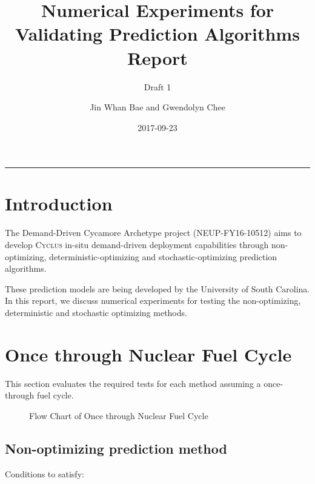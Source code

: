 \documentclass[12pt,letterpaper]{article}
\title{Numerical Experiments for Validating Prediction Algorithms Report}
\subtitle{Draft 1}
\author{Jin Whan Bae and Gwendolyn Chee}
\date{2017-09-23}
\newcommand{\Cyclus}{\textsc{Cyclus}\xspace}%
\begin{document}
	
	\maketitle
	\hrule
	\onehalfspacing
	\thispagestyle{empty}

\section*{Introduction}
The Demand-Driven Cycamore Archetype project (NEUP-FY16-10512) aims to develop \Cyclus in-situ demand-driven deployment capabilities through non-optimizing, deterministic-optimizing and stochastic-optimizing prediction algorithms.

These prediction models are being developed by the University of South Carolina. In this report, we discuss numerical experiments for testing the non-optimizing, deterministic and stochastic optimizing methods. 

\section{Once through Nuclear Fuel Cycle}
This section evaluates the required tests for
each method assuming a once-through fuel cycle.

\begin{figure}[H]
\caption{Flow Chart of Once through Nuclear Fuel Cycle}
\end{figure}

\subsection*{Non-optimizing prediction method}
Conditions to satisfy: 
\end{document}
